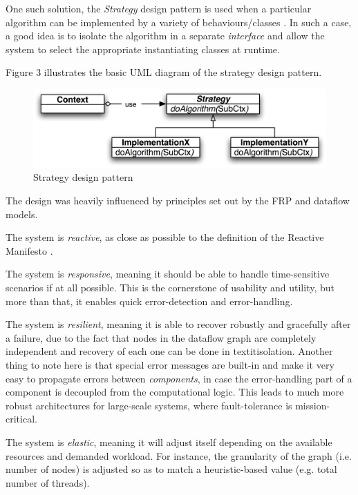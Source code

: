 \documentclass{dithesis}
\begin{document}
One such solution, the \textit{Strategy} design pattern is used when a particular algorithm can be implemented by a variety of behaviours/classes \cite{design}. In such a case, a good idea is to isolate the algorithm in a separate \textit{interface} and allow the system to select the appropriate instantiating classes at runtime.

Figure 3 illustrates the basic UML diagram of the strategy design pattern.

\begin{figure}[h!] \begin{center}    
	\includegraphics[scale=0.1]{strategy}
  	\caption{Strategy design pattern}
\end{center} \end{figure}

The design was heavily influenced by principles set out by the FRP and dataflow models. 


The system is \textit{reactive}, as close as possible to the definition of the Reactive Manifesto \cite{manifesto}. 

The system is \textit{responsive}, meaning it should be able to handle time-sensitive scenarios if at all possible. This is the cornerstone of usability and utility, but more than that, it enables quick error-detection and error-handling.

The system is \textit{resilient}, meaning it is able to recover robustly and gracefully after a failure, due to the fact that nodes in the dataflow graph are completely independent and recovery of each one can be done in textit{isolation}. Another thing to note here is that special error messages are built-in and make it very easy to propagate errors between \textit{components}, in case the error-handling part of a component is decoupled from the computational logic. This leads to much more robust architectures for large-scale systems, where fault-tolerance is mission-critical.

The system is \textit{elastic}, meaning it will adjust itself depending on the available resources and demanded workload. For instance, the granularity of the graph (i.e. number of nodes) is adjusted so as to match a heuristic-based value (e.g. total number of threads).
\end{document}

